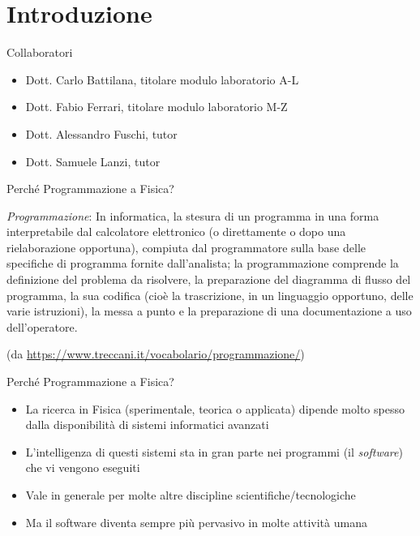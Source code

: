 
\section*{Introduzione}

\begin{frame}{Collaboratori}

  \begin{itemize}
  \item Dott. Carlo Battilana, titolare modulo laboratorio A-L
  \item Dott. Fabio Ferrari, titolare modulo laboratorio M-Z
  \item Dott. Alessandro Fuschi, tutor
  \item Dott. Samuele Lanzi, tutor
  \end{itemize}

\end{frame}

\begin{frame}{Perché Programmazione a Fisica?}

  \textit{Programmazione}: In informatica, la stesura di un programma in una
  forma interpretabile dal calcolatore elettronico (o direttamente o dopo una
  rielaborazione opportuna), compiuta dal programmatore sulla base delle
  specifiche di programma fornite dall'analista; la programmazione comprende la
  definizione del problema da risolvere, la preparazione del diagramma di flusso
  del programma, la sua codifica (cioè la trascrizione, in un linguaggio
  opportuno, delle varie istruzioni), la messa a punto e la preparazione di una
  documentazione a uso dell'operatore.

  {\tiny (da \url{https://www.treccani.it/vocabolario/programmazione/})}

\end{frame}

\begin{frame}{Perché Programmazione a Fisica? \insertcontinuationtext}

  \begin{itemize}[<+->]
  \item La ricerca in Fisica (sperimentale, teorica o applicata) dipende
    molto spesso dalla disponibilità di sistemi informatici avanzati
  \item L'intelligenza di questi sistemi sta in gran parte nei programmi (il
    \textit{software}) che vi vengono eseguiti
  \item Vale in generale per molte altre discipline scientifiche/tecnologiche
  \item Ma il software diventa sempre più pervasivo in molte attività umana
  \end{itemize}

\end{frame}


